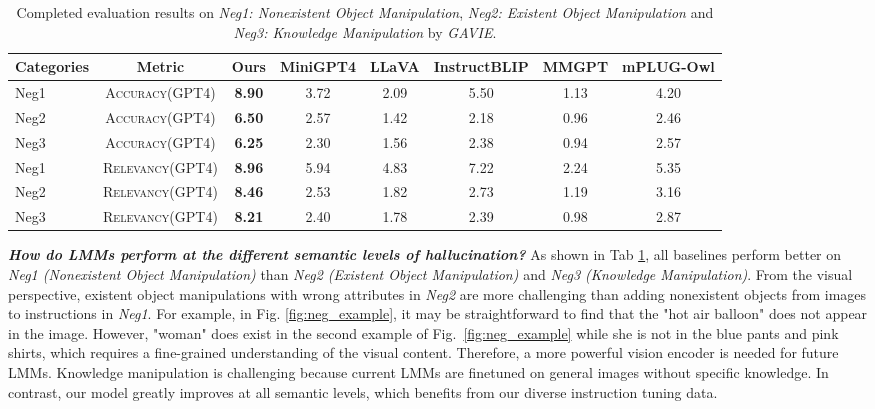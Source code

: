 \begin{table}[t]
\setlength\tabcolsep{3pt}
\centering
\small
\begin{tabular}{lccccccc}
\toprule[1.5pt]
Categories& Metric&\textbf{Ours} & MiniGPT4 & LLaVA & InstructBLIP & MMGPT& mPLUG-Owl\\
\midrule
Neg1 & \textsc{Accuracy(GPT4)} & \textbf{8.90} & 3.72 & 2.09 & 5.50 & 1.13 & 4.20\\
Neg2 & \textsc{Accuracy(GPT4)} & \textbf{6.50} & 2.57 & 1.42 & 2.18 & 0.96& 2.46\\
Neg3 & \textsc{Accuracy(GPT4)} & \textbf{6.25} & 2.30 & 1.56 & 2.38 & 0.94& 2.57\\
\midrule
Neg1 & \textsc{Relevancy(GPT4)} & \textbf{8.96} & 5.94 & 4.83 & 7.22 & 2.24 & 5.35\\
Neg2 & \textsc{Relevancy(GPT4)} & \textbf{8.46} & 2.53 & 1.82 & 2.73 & 1.19& 3.16\\
Neg3 & \textsc{Relevancy(GPT4)} & \textbf{8.21} & 2.40 & 1.78 & 2.39 & 0.98& 2.87\\
\bottomrule[1.5pt]
\end{tabular}
\vspace{2mm}
\caption{
Completed evaluation results on \textit{Neg1: Nonexistent Object Manipulation}, \textit{Neg2: Existent Object Manipulation} and \textit{Neg3: Knowledge Manipulation} by \textit{GAVIE}.}
\label{tab:neg1neg2}
\vspace{-0.1in}
\end{table}

\textbf{\textit{How do LMMs perform at the different semantic levels of hallucination? }}As shown in Tab \ref{tab:neg1neg2}, all baselines perform better on \textit{Neg1 (Nonexistent Object Manipulation)} than \textit{Neg2 (Existent Object Manipulation)} and \textit{Neg3 (Knowledge Manipulation)}. From the visual perspective, existent object manipulations with wrong attributes in \textit{Neg2} are more challenging than adding nonexistent objects from images to instructions in \textit{Neg1}. For example, in Fig. \ref{fig:neg_example}, it %
may be straightforward to find that the "hot air balloon" does not appear in the image. However, "woman" does exist in the second example of Fig.~\ref{fig:neg_example} while she is not in the blue pants and pink shirts, which requires a fine-grained understanding of the visual content. Therefore, a more powerful vision encoder is needed for future LMMs. Knowledge manipulation is challenging because current LMMs are finetuned on general images without specific knowledge. In contrast, our model greatly improves at all semantic levels, which benefits from our diverse instruction tuning data. 



